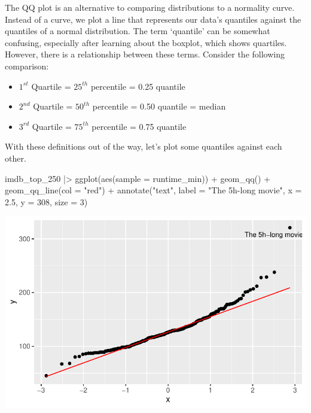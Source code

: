 \documentclass[
  letterpaper,
]{krantz}
\makeatletter
\newenvironment{Shaded}{\begin{snugshade}}{\end{snugshade}}
\newcommand{\AttributeTok}[1]{\textcolor[rgb]{0.40,0.45,0.13}{#1}}
\newcommand{\DecValTok}[1]{\textcolor[rgb]{0.68,0.00,0.00}{#1}}
\newcommand{\FloatTok}[1]{\textcolor[rgb]{0.68,0.00,0.00}{#1}}
\newcommand{\FunctionTok}[1]{\textcolor[rgb]{0.28,0.35,0.67}{#1}}
\newcommand{\NormalTok}[1]{\textcolor[rgb]{0.00,0.23,0.31}{#1}}
\newcommand{\SpecialCharTok}[1]{\textcolor[rgb]{0.37,0.37,0.37}{#1}}
\newcommand{\StringTok}[1]{\textcolor[rgb]{0.13,0.47,0.30}{#1}}
\newenvironment{kframe}{%
\medskip{}
\setlength{\fboxsep}{.8em}
 \def\at@end@of@kframe{}%
 \ifinner\ifhmode%
  \def\at@end@of@kframe{\end{minipage}}%
  \begin{minipage}{\columnwidth}%
 \fi\fi%
 \def\FrameCommand##1{\hskip\@totalleftmargin \hskip-\fboxsep
 \colorbox{shadecolor}{##1}\hskip-\fboxsep
     \hskip-\linewidth \hskip-\@totalleftmargin \hskip\columnwidth}%
 \MakeFramed {\advance\hsize-\width
   \@totalleftmargin\z@ \linewidth\hsize
   \@setminipage}}%
 {\par\unskip\endMakeFramed%
 \at@end@of@kframe}
\renewenvironment{Shaded}{\begin{kframe}}{\end{kframe}}
\makeatother
\begin{document}
The QQ plot is an alternative to comparing distributions to a normality
curve. Instead of a curve, we plot a line that represents our data's
quantiles against the quantiles of a normal distribution. The term
`quantile' can be somewhat confusing, especially after learning about
the boxplot, which shows quartiles. However, there is a relationship
between these terms. Consider the following comparison:

\begin{itemize}
\item
  \(1^{st}\) Quartile = \(25^{th}\) percentile = 0.25 quantile
\item
  \(2^{nd}\) Quartile = \(50^{th}\) percentile = 0.50 quantile = median
\item
  \(3^{rd}\) Quartile = \(75^{th}\) percentile = 0.75 quantile
\end{itemize}

With these definitions out of the way, let's plot some quantiles against
each other.

\begin{Shaded}
\begin{Highlighting}[]
\NormalTok{imdb\_top\_250 }\SpecialCharTok{|\textgreater{}}
  \FunctionTok{ggplot}\NormalTok{(}\FunctionTok{aes}\NormalTok{(}\AttributeTok{sample =}\NormalTok{ runtime\_min)) }\SpecialCharTok{+}
  \FunctionTok{geom\_qq}\NormalTok{() }\SpecialCharTok{+}
  \FunctionTok{geom\_qq\_line}\NormalTok{(}\AttributeTok{col =} \StringTok{"red"}\NormalTok{) }\SpecialCharTok{+}
  \FunctionTok{annotate}\NormalTok{(}\StringTok{"text"}\NormalTok{,}
           \AttributeTok{label =} \StringTok{"The 5h{-}long movie"}\NormalTok{,}
           \AttributeTok{x =} \FloatTok{2.5}\NormalTok{,}
           \AttributeTok{y =} \DecValTok{308}\NormalTok{,}
           \AttributeTok{size =} \DecValTok{3}\NormalTok{)}
\end{Highlighting}
\end{Shaded}

\includegraphics{08_descriptive_statistics_files/figure-pdf/qq-plot-1.pdf}
\end{document}
